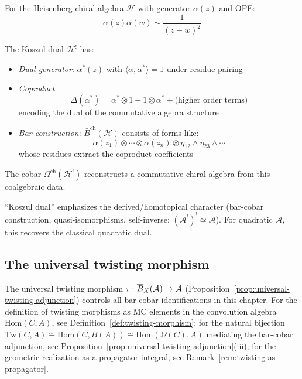 \begin{example}
For the Heisenberg chiral algebra $\mathcal{H}$ with generator $\alpha(z)$ and OPE:
\[\alpha(z)\alpha(w) \sim \frac{1}{(z-w)^2}\]

The Koszul dual $\mathcal{H}^!$ has:
\begin{itemize}
\item \emph{Dual generator}: $\alpha^*(z)$ with $\langle \alpha, \alpha^* \rangle = 1$ under residue pairing
\item \emph{Coproduct}: 
   \[\Delta(\alpha^*) = \alpha^* \otimes 1 + 1 \otimes \alpha^* + \text{(higher order terms)}\]
   encoding the dual of the commutative algebra structure
\item \emph{Bar construction}: $\bar{B}^{\text{ch}}(\mathcal{H})$ consists of forms like:
   \[\alpha(z_1) \otimes \cdots \otimes \alpha(z_n) \otimes \eta_{12} \wedge \eta_{23} \wedge \cdots\]
   whose residues extract the coproduct coefficients
\end{itemize}

The cobar $\Omega^{\text{ch}}(\mathcal{H}^!)$ reconstructs a commutative chiral algebra from this coalgebraic data.
\end{example}

\begin{remark}
``Koszul dual'' emphasizes the derived/homotopical character
(bar-cobar construction, quasi-isomorphisms, self-inverse:
$(\mathcal{A}^!)^! \simeq \mathcal{A}$).  For quadratic $\mathcal{A}$,
this recovers the classical quadratic dual.
\end{remark}

\subsection{The universal twisting morphism}

The universal twisting morphism
$\pi\colon \overline{B}_X(\mathcal{A}) \to \mathcal{A}$
(Proposition~\ref{prop:universal-twisting-adjunction}) controls
all bar-cobar identifications in this chapter.  For the definition
of twisting morphisms as MC elements in the convolution
algebra $\mathrm{Hom}(C, A)$, see
Definition~\ref{def:twisting-morphism}; for the natural bijection
$\mathrm{Tw}(C, A) \cong \mathrm{Hom}(C, B(A)) \cong
\mathrm{Hom}(\Omega(C), A)$
mediating the bar-cobar adjunction, see
Proposition~\ref{prop:universal-twisting-adjunction}(iii); for the
geometric realization as a propagator integral, see
Remark~\ref{rem:twisting-as-propagator}.


